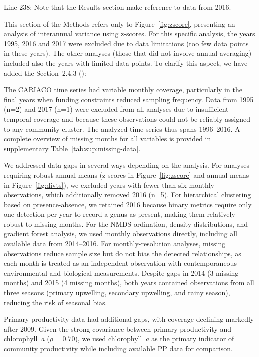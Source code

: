 \documentclass[12pt,english]{reviewresponse}
\begin{document}
\begin{revcomment}\label{comment:datapoints}
Line 238: Note that the Results section make reference to data from 2016.
\end{revcomment}
\begin{revresponse}
	This section of the Methods refers only to Figure~\ref{fig:zscore}, presenting an analysis of interannual variance using z-scores. For this specific analysis, the years 1995, 2016 and 2017 were excluded due to data limitations (too few data points in these years). The other analyses (those that did not involve annual averaging) included also the years with limited data points. To clarify this aspect, we have added the Section~2.4.3 ():
        \begin{changes}
            The CARIACO time series had variable monthly coverage, particularly in the final years when funding constraints reduced sampling frequency. Data from 1995 (n=2) and 2017 (n=1) were excluded from all analyses due to insufficient temporal coverage and because these observations could not be reliably assigned to any community cluster. The analyzed time series thus spans 1996–2016. A complete overview of missing months for all variables is provided in supplementary Table~\ref{tab:sup:missing-data}.
    
            We addressed data gaps in several ways depending on the analysis. For analyses requiring robust annual means (z-scores in Figure~\ref{fig:zscore} and annual means in Figure~\ref{fig:divts}), we excluded years with fewer than six monthly observations, which additionally removed 2016 (n=5). For hierarchical clustering based on presence-absence, we retained 2016 because binary metrics require only one detection per year to record a genus as present, making them relatively robust to missing months. For the NMDS ordination, density distributions, and gradient forest analysis, we used monthly observations directly, including all available data from 2014–2016. For monthly-resolution analyses, missing observations reduce sample size but do not bias the detected relationships, as each month is treated as an independent observation with contemporaneous environmental and biological measurements. Despite gaps in 2014 (3 missing months) and 2015 (4 missing months), both years contained observations from all three seasons (primary upwelling, secondary upwelling, and rainy season), reducing the risk of seasonal bias.
    
            Primary productivity data had additional gaps, with coverage declining markedly after 2009. Given the strong covariance between primary productivity and chlorophyll~\textit{a} ($\rho = 0.70$), we used chlorophyll~\textit{a} as the primary indicator of community productivity while including available PP data for comparison.
        \end{changes}
\end{revresponse}
\end{document}

